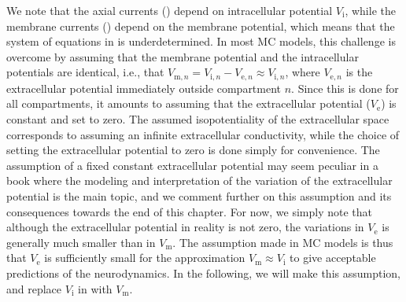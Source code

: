 We note that the axial currents () depend on intracellular potential $V_{\mathrm{i}}$, while the membrane currents () depend on the membrane potential, which means that the system of equations in  is underdetermined. In most MC models, this challenge is overcome by assuming that the membrane potential and the intracellular potentials are identical, i.e., that $V_{\mathrm{m},n} = V_{\mathrm{i},n}-V_{\mathrm{e},n} \approx V_{\mathrm{i},n}$, where $V_{\mathrm{e},n}$ is the extracellular potential immediately outside compartment $n$. Since this is done for all compartments, it amounts to assuming that the extracellular potential ($V_{\mathrm{e}}$) is constant and set to zero. The assumed isopotentiality of the extracellular space corresponds to assuming an infinite
extracellular conductivity, while the choice of setting the extracellular potential to zero is done simply for convenience. 
The assumption of a fixed constant extracellular potential may seem peculiar in a book where the modeling and interpretation of the variation of the extracellular potential is the main topic, and we comment further on this assumption and its consequences towards the end of this chapter. For now, we simply note that although the extracellular potential in reality is not zero, the variations in $V_\mathrm{e}$ is generally much smaller than in $V_\mathrm{m}$. The assumption made in MC models is thus that $V_\mathrm{e}$ is sufficiently small for the approximation $V_{\mathrm{m}} \approx V_{\mathrm{i}}$ to give acceptable predictions of the neurodynamics. In the following, we will make this assumption, and replace $V_\mathrm{i}$ in  with $V_\mathrm{m}$.



